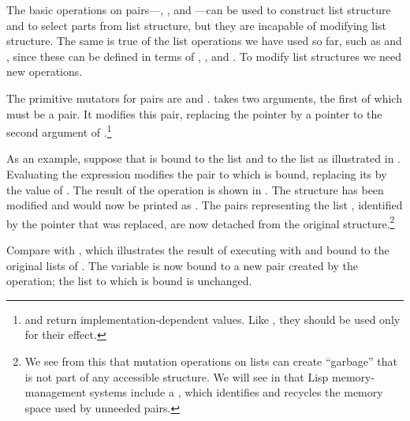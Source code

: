 The basic operations on pairs---, , and ---can
be used to construct list structure and to select parts from list structure,
but they are incapable of modifying list structure.  The same is true of the
list operations we have used so far, such as  and ,
since these can be defined in terms of , , and .
To modify list structures we need new operations.

The primitive mutators for pairs are  and
.  takes two arguments, the first of which must
be a pair.  It modifies this pair, replacing the  pointer by a
pointer to the second argument of .\footnote{ and
 return implementation-dependent values.  Like , they
should be used only for their effect.}

As an example, suppose that  is bound to the list 
and  to the list  as illustrated in .
Evaluating the expression  modifies the pair to which
 is bound, replacing its  by the value of .  The
result of the operation is shown in .  The structure 
has been modified and would now be printed as .  The pairs
representing the list , identified by the pointer that was
replaced, are now detached from the original structure.\footnote{We see from
this that mutation operations on lists can create ``garbage'' that is not part
of any accessible structure.  We will see in  that Lisp
memory-management systems include a , which
identifies and recycles the memory space used by unneeded pairs.}

Compare  with , which illustrates the result
of executing  with  and 
bound to the original lists of .  The variable  is now
bound to a new pair created by the  operation; the list to which
 is bound is unchanged.

